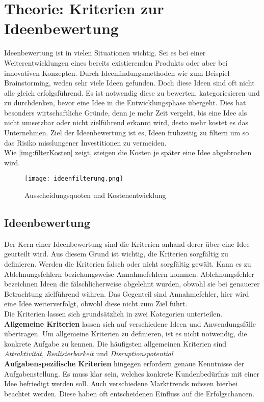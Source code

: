 \newpage
\section{Theorie: Kriterien zur Ideenbewertung}\label{sec:theorie}
Ideenbewertung ist in vielen Situationen wichtig. Sei es bei einer Weiterentwicklungen eines 
bereits existierenden Produkts oder aber bei innovativen Konzepten.
Durch Ideenfindungsmethoden wie zum Beispiel Brainstorming, weden sehr viele Ideen gefunden. Doch diese Ideen 
sind oft nicht alle gleich erfolgsführend. Es ist notwendig diese zu bewerten, kategoriesieren und zu durchdenken, bevor
eine Idee in die Entwicklungsphase übergeht. Dies hat besonders wirtschaftliche Gründe, denn je mehr 
Zeit vergeht, bis eine Idee als nicht umsetzbar oder nicht zielführend erkannt wird, desto mehr kostet es das Unternehmen.
Ziel der Ideenbewertung ist es, Ideen frühzeitig zu filtern um so das Risiko misslungener Investitionen zu vermeiden.
\cite{grossklaus:2008}\\
Wie \autoref{img:filterKosten} zeigt, steigen die Kosten je später eine Idee abgebrochen wird.
\begin{figure}[h]
	\centering
	\texttt{[image: ideenfilterung.png]}
	\caption{Ausscheidungsquoten und Kostenentwicklung}
	\label{img:filterKosten}
\end{figure}

\subsection{Ideenbewertung}
Der Kern einer Ideenbewertung sind die Kriterien anhand derer über eine Idee geurteilt wird.
Aus diesem Grund ist wichtig, die Kriterien sorgfältig zu definieren. Werden die Kriterien falsch oder nicht sorgfältig gewält. 
Kann es zu Ablehnungsfehlern beziehungsweise Annahmefehlern kommen. 
Ablehnungsfehler bezeichnen Ideen die fälschlicherweise abgelehnt wurden, obwohl sie bei genauerer Betrachtung 
zielführend währen. Das Gegenteil sind Annahmefehler, hier wird eine Idee weiterverfolgt, obwohl diese nicht zum Ziel führt. \\
Die Kriterien lassen sich grundsätzlich in zwei Kategorien unterteilen.
\textbf{Allgemeine Kriterien} lassen sich auf verschiedene Ideen und Anwendungsfälle übertragen.
Um allgemeine Kriterien zu definieren, ist es nicht notwendig, die konkrete Aufgabe zu kennen. 
Die häufigsten allgemeinen Kriterien sind \textit{Attraktivität}, \textit{Realisierbarkeit} und 
\textit{Disruptionspotential}\\
\textbf{Aufgabenspezifische Kriterien} hingegen erfordern genaue Kenntnisse der Aufgabenstellung. Es muss klar sein, welches 
konkrete Kundenbedürfnis mit einer Idee befriedigt werden soll. Auch verschiedene Markttrends müssen hierbei beachtet werden. 
Diese haben oft entscheidenen Einfluss auf die Erfolgschancen. 


